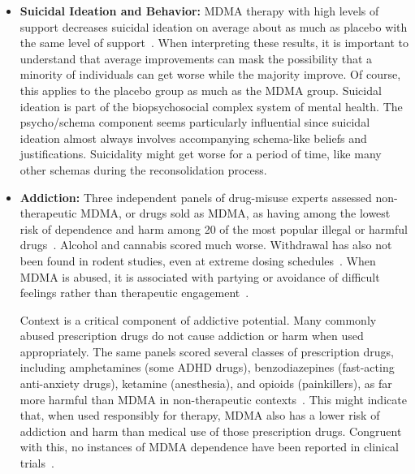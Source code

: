 \documentclass[11pt,oneside]{book}
\let\cite\parencite
\begin{document}
\begin{itemize}
    MDMA-induced psychosis is a risk for those with a predisposition, but some people with risk factors may still think it's worth trying. There are some precautions people with a history of psychosis should take if they try MDMA therapy. You could minimize the known risk factors of stress~\cite{winkelPsychosisStress}, cannabis~\cite{drugsPsychosis}, and abrupt withdrawal of antipsychotics~\cite{moncrieffAntiPsychotics}. Skipping the booster dose of MDMA should also help, assuming a dose-dependent risk.
    \item \textbf{Suicidal Ideation and Behavior:} MDMA therapy with high levels of support decreases suicidal ideation on average about as much as placebo with the same level of support~\cite{mitchellMDMAClinicalTrial,mitchellMDMAClinicalTrial2}. When interpreting these results, it is important to understand that average improvements can mask the possibility that a minority of individuals can get worse while the majority improve. Of course, this applies to the placebo group as much as the MDMA group. Suicidal ideation is part of the biopsychosocial complex system of mental health. The psycho/schema component seems particularly influential since suicidal ideation almost always involves accompanying schema-like beliefs and justifications. Suicidality might get worse for a period of time, like many other schemas during the reconsolidation process.
    \item \textbf{Addiction:}
    Three independent panels of drug-misuse experts assessed non-therapeutic MDMA, or drugs sold as MDMA, as having among the lowest risk of dependence and harm among 20 of the most popular illegal or harmful drugs~\cite{nuttDrugHarms,bonomoHarms,crossinHarms}. Alcohol and cannabis scored much worse. Withdrawal has also not been found in rodent studies, even at extreme dosing schedules~\cite{robledoDependence}. When MDMA is abused, it is associated with partying or avoidance of difficult feelings rather than therapeutic engagement~\cite{erowidAbuse}.

    Context is a critical component of addictive potential. Many commonly abused prescription drugs do not cause addiction or harm when used appropriately. The same panels scored several classes of prescription drugs, including amphetamines (some ADHD drugs), benzodiazepines (fast-acting anti-anxiety drugs), ketamine (anesthesia), and opioids (painkillers), as far more harmful than MDMA in non-therapeutic contexts~\cite{nuttDrugHarms,crossingZero,bonomoHarms}. This might indicate that, when used responsibly for therapy, MDMA also has a lower risk of addiction and harm than medical use of those prescription drugs. Congruent with this, no instances of MDMA dependence have been reported in clinical trials~\cite{colcott2024side}.


\end{itemize}
\end{document}
